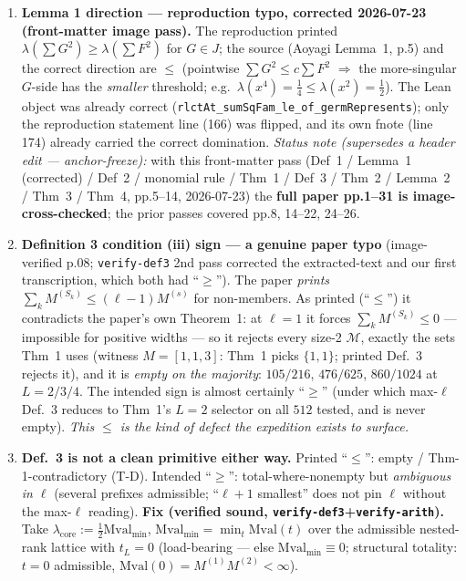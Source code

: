 \documentclass[11pt]{article}
\theoremstyle{plain}
\theoremstyle{definition}
\theoremstyle{remark}
\newcommand{\rlct}{\lambda}          %
\newcommand{\Mval}{\mathrm{Mval}}
\begin{document}
\begin{enumerate}
\item[(R-1)] \textbf{Lemma 1 direction --- reproduction typo, corrected 2026-07-23 (front-matter
image pass).} The reproduction printed $\rlct(\sum G^2)\ge\rlct(\sum F^2)$ for $G\in J$; the source
(Aoyagi Lemma~1, p.5) and the correct direction are $\le$ (pointwise $\sum G^2\le c\sum F^2$
$\Rightarrow$ the more-singular $G$-side has the \emph{smaller} threshold; e.g.\
$\rlct(x^4)=\tfrac14\le\rlct(x^2)=\tfrac12$). The Lean object was already correct
(\texttt{rlctAt\_sumSqFam\_le\_of\_germRepresents}); only the reproduction statement line (166) was
flipped, and its own fnote (line 174) already carried the correct domination. \emph{Status note
(supersedes a header edit --- anchor-freeze):} with this front-matter pass (Def~1 / Lemma~1
(corrected) / Def~2 / monomial rule / Thm~1 / Def~3 / Thm~2 / Lemma~2 / Thm~3 / Thm~4, pp.5--14,
2026-07-23) the \textbf{full paper pp.1--31 is image-cross-checked}; the prior passes covered
pp.8, 14--22, 24--26.
\item[(T-D)] \textbf{Definition 3 condition (iii) sign --- a genuine paper typo}
(image-verified p.08; \texttt{verify-def3} 2nd pass corrected the extracted-text and our
first transcription, which both had ``$\ge$''). The paper \emph{prints}
$\sum_k M^{(S_k)}\le(\ell-1)M^{(s)}$ for non-members. As printed (``$\le$'') it contradicts
the paper's own Theorem~1: at $\ell=1$ it forces $\sum_k M^{(S_k)}\le0$ --- impossible for
positive widths --- so it rejects every size-2 $\mathcal M$, exactly the sets Thm~1 uses
(witness $M=[1,1,3]$: Thm~1 picks $\{1,1\}$; printed Def.~3 rejects it), and it is
\emph{empty on the majority}: $105/216$, $476/625$, $860/1024$ at $L{=}2/3/4$. The intended
sign is almost certainly ``$\ge$'' (under which max-$\ell$ Def.~3 reduces to Thm~1's $L=2$
selector on all $512$ tested, and is never empty). \emph{This $\le$ is the kind of defect
the expedition exists to surface.}
\item[(F-1)] \textbf{Def.~3 is not a clean primitive either way.} Printed ``$\le$'':
empty / Thm-1-contradictory (T-D). Intended ``$\ge$'': total-where-nonempty but
\emph{ambiguous in $\ell$} (several prefixes admissible; ``$\ell+1$ smallest'' does not pin
$\ell$ without the max-$\ell$ reading). \textbf{Fix (verified sound,
\texttt{verify-def3}+\texttt{verify-arith}).} Take
$\rlct_{\mathrm{core}}:=\tfrac12\Mval_{\min}$, $\Mval_{\min}=\min_t\Mval(t)$ over the
admissible nested-rank lattice with \textbf{$t_L=0$} (load-bearing --- else
$\Mval_{\min}\equiv0$; structural totality: $t{=}0$ admissible, $\Mval(0)=M^{(1)}M^{(2)}<\infty$).

\end{enumerate}
\end{document}
